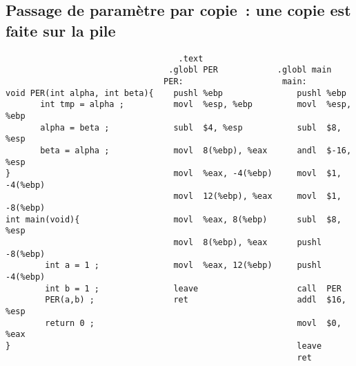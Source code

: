 \begin{frame}
  \section{Passage de param\`etre par copie~: une copie est faite sur la pile}%
\begin{verbatim}
                                   .text                                         
                                 .globl PER            .globl main   
                                PER:                    main:         
void PER(int alpha, int beta){    pushl %ebp               pushl %ebp     
       int tmp = alpha ;          movl  %esp, %ebp         movl  %esp, %ebp    
       alpha = beta ;             subl  $4, %esp           subl  $8, %esp  
       beta = alpha ;             movl  8(%ebp), %eax      andl  $-16, %esp    
}                                 movl  %eax, -4(%ebp)     movl  $1, -4(%ebp)  
                                  movl  12(%ebp), %eax     movl  $1, -8(%ebp)  
int main(void){                   movl  %eax, 8(%ebp)      subl  $8, %esp  
                                  movl  8(%ebp), %eax      pushl -8(%ebp)  
        int a = 1 ;               movl  %eax, 12(%ebp)     pushl -4(%ebp)  
        int b = 1 ;               leave                    call  PER       
        PER(a,b) ;                ret                      addl  $16, %esp 
        return 0 ;                                         movl  $0, %eax  
}                                                          leave           
                                                           ret            
\end{verbatim}
\end{frame}
